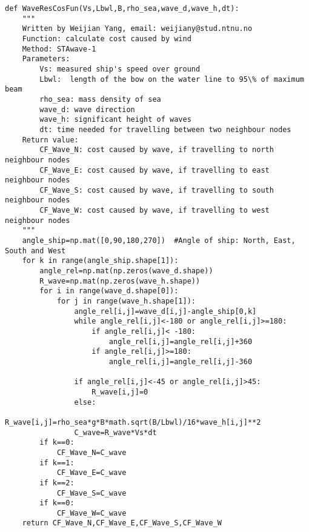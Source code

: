 \begin{lstlisting}[caption=Function for calculating cost caused by wave (\autoref{Cost Wave}), label=calcostwave]
def WaveResCosFun(Vs,Lbwl,B,rho_sea,wave_d,wave_h,dt):
    """     
    Written by Weijian Yang, email: weijiany@stud.ntnu.no
    Function: calculate cost caused by wind
    Method: STAwave-1
    Parameters:
        Vs: measured ship's speed over ground
        Lbwl:  length of the bow on the water line to 95\% of maximum beam
        rho_sea: mass density of sea
        wave_d: wave direction
        wave_h: significant height of waves
        dt: time needed for travelling between two neighbour nodes
    Return value:
        CF_Wave_N: cost caused by wave, if travelling to north neighbour nodes
        CF_Wave_E: cost caused by wave, if travelling to east neighbour nodes
        CF_Wave_S: cost caused by wave, if travelling to south neighbour nodes
        CF_Wave_W: cost caused by wave, if travelling to west neighbour nodes
    """
    angle_ship=np.mat([0,90,180,270])  #Angle of ship: North, East, South and West
    for k in range(angle_ship.shape[1]):
        angle_rel=np.mat(np.zeros(wave_d.shape))
        R_wave=np.mat(np.zeros(wave_h.shape))
        for i in range(wave_d.shape[0]):
            for j in range(wave_h.shape[1]):
                angle_rel[i,j]=wave_d[i,j]-angle_ship[0,k]
                while angle_rel[i,j]<-180 or angle_rel[i,j]>=180:
                    if angle_rel[i,j]< -180:
                        angle_rel[i,j]=angle_rel[i,j]+360
                    if angle_rel[i,j]>=180:
                        angle_rel[i,j]=angle_rel[i,j]-360
                
                if angle_rel[i,j]<-45 or angle_rel[i,j]>45:
                    R_wave[i,j]=0
                else:
                    R_wave[i,j]=rho_sea*g*B*math.sqrt(B/Lbwl)/16*wave_h[i,j]**2
                C_wave=R_wave*Vs*dt
        if k==0:
            CF_Wave_N=C_wave
        if k==1:
            CF_Wave_E=C_wave
        if k==2:
            CF_Wave_S=C_wave
        if k==0:
            CF_Wave_W=C_wave
    return CF_Wave_N,CF_Wave_E,CF_Wave_S,CF_Wave_W
\end{lstlisting}
